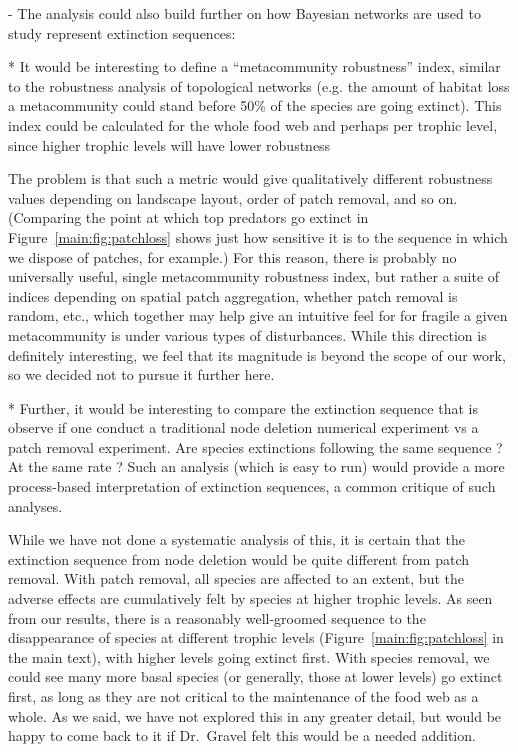 \documentclass[11pt]{article}
\newcommand{\us}{\rm \setlength{\leftskip}{0.3cm} \setlength{\rightskip}{0.3cm}}
\newcommand{\them}{\it \setlength{\leftskip}{0cm} \setlength{\rightskip}{0cm}}
\begin{document}
\them

- The analysis could also build further on how Bayesian networks are used to study represent extinction sequences:

* It would be interesting to define a ``metacommunity robustness'' index, similar to the robustness analysis of topological networks (e.g. the amount of habitat loss a metacommunity could stand before 50\% of the species are going extinct). This index could be calculated for the whole food web and perhaps per trophic level, since higher trophic levels will have lower robustness

\us

The problem is that such a metric would give qualitatively different robustness values depending on landscape layout, order of patch removal, and so on. (Comparing the point at which top predators go extinct in Figure~\ref{main:fig:patchloss} shows just how sensitive it is to the sequence in which we dispose of patches, for example.) For this reason, there is probably no universally useful, single metacommunity robustness index, but rather a suite of indices depending on spatial patch aggregation, whether patch removal is random, etc., which together may help give an intuitive feel for for fragile a given metacommunity is under various types of disturbances. While this direction is definitely interesting, we feel that its magnitude is beyond the scope of our work, so we decided not to pursue it further here.

\them

* Further, it would be interesting to compare the extinction sequence that is observe if one conduct a traditional node deletion numerical experiment vs a patch removal experiment. Are species extinctions following the same sequence ? At the same rate ? Such an analysis (which is easy to run) would provide a more process-based interpretation of extinction sequences, a common critique of such analyses.

\us

While we have not done a systematic analysis of this, it is certain that the extinction sequence from node deletion would be quite different from patch removal. With patch removal, all species are affected to an extent, but the adverse effects are cumulatively felt by species at higher trophic levels. As seen from our results, there is a reasonably well-groomed sequence to the disappearance of species at different trophic levels (Figure~\ref{main:fig:patchloss} in the main text), with higher levels going extinct first. With species removal, we could see many more basal species (or generally, those at lower levels) go extinct first, as long as they are not critical to the maintenance of the food web as a whole. As we said, we have not explored this in any greater detail, but would be happy to come back to it if Dr.~Gravel felt this would be a needed addition.
\end{document}
